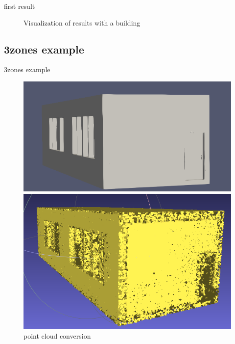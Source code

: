 \documentclass[10pt]{beamer}
\begin{document}
\begin{frame}{first result}
\begin{figure}[H]
\begin{minipage}[t]{0.35\textwidth}
    \caption*{inria result}
    \end{minipage}
    \caption{Visualization of results with a building}
    \end{figure}
\end{frame}
\subsection*{3zones example}
\begin{frame}{3zones example}
    \begin{figure}[H]
        \centering
        \begin{minipage}[t]{0.52\textwidth}
          \includegraphics[width=\textwidth]{../../images/screen_kinetic/3zones.png}
          \caption*{3zones}
        \end{minipage}
        \begin{minipage}[t]{0.47\textwidth}
            \includegraphics[width=\textwidth]{../../images/screen_kinetic/3zones_point_cloud.png}
            \caption*{3zones point cloud}
          \end{minipage}
        \caption{point cloud conversion}
      \end{figure}  
\end{frame}
\end{document}
